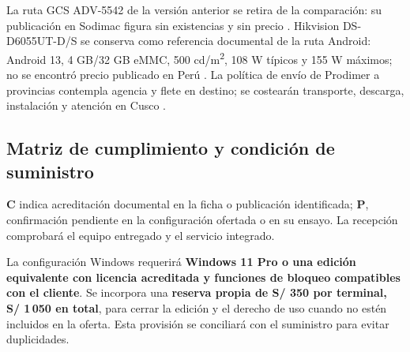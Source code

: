 La ruta GCS ADV-5542 de la versión anterior se retira de la comparación: su publicación en Sodimac figura sin existencias y sin precio \cite{gcstnt}. Hikvision DS-D6055UT-D/S se conserva como referencia documental de la ruta Android: Android 13, 4 GB/32 GB eMMC, 500 cd/m\textsuperscript{2}, 108 W típicos y 155 W máximos; no se encontró precio publicado en Perú \cite{hikvision}. La política de envío de Prodimer a provincias contempla agencia y flete en destino; se costearán transporte, descarga, instalación y atención en Cusco \cite{prodimer}.

\subsection{Matriz de cumplimiento y condición de suministro}
\textbf{C} indica acreditación documental en la ficha o publicación identificada; \textbf{P}, confirmación pendiente en la configuración ofertada o en su ensayo. La recepción comprobará el equipo entregado y el servicio integrado.


La configuración Windows requerirá \textbf{Windows 11 Pro o una edición equivalente con licencia acreditada y funciones de bloqueo compatibles con el cliente}. Se incorpora una \textbf{reserva propia de S/ 350 por terminal, S/ 1\,050 en total}, para cerrar la edición y el derecho de uso cuando no estén incluidos en la oferta. Esta provisión se conciliará con el suministro para evitar duplicidades.

